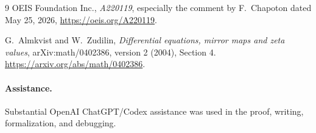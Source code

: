 \documentclass[11pt]{article}
\begin{document}
\begin{thebibliography}{9}
OEIS Foundation Inc.,
\emph{A220119}, especially the comment by F.~Chapoton dated May 25, 2026,
\url{https://oeis.org/A220119}.

G.~Almkvist and W.~Zudilin,
\emph{Differential equations, mirror maps and zeta values},
arXiv:math/0402386, version 2 (2004), Section 4.
\url{https://arxiv.org/abs/math/0402386}.
\end{thebibliography}
\paragraph{Assistance.} Substantial OpenAI ChatGPT/Codex assistance was used in the proof, writing, formalization, and debugging.
\end{document}
